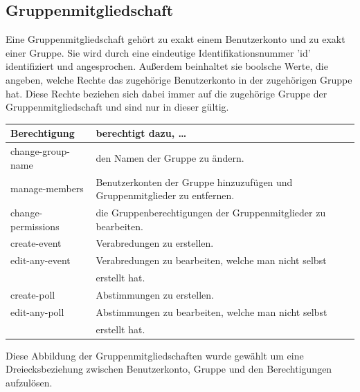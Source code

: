 \documentclass[parskip=full,11pt]{scrartcl}
\begin{document}
\pagebreak

\subsection{Gruppenmitgliedschaft}
Eine Gruppenmitgliedschaft gehört zu exakt einem Benutzerkonto und zu exakt
einer Gruppe. Sie wird durch eine eindeutige Identifikationsnummer 'id'
identifiziert und angesprochen. Außerdem beinhaltet sie boolsche Werte,
die angeben, welche Rechte das zugehörige Benutzerkonto in der zugehörigen
Gruppe hat. Diese Rechte beziehen sich dabei immer auf die zugehörige Gruppe
der Gruppenmitgliedschaft und sind nur in dieser gültig.\\

\begin{tabu} to \linewidth { l X }
    \textbf{Berechtigung} & \textbf{berechtigt dazu, \dots}\\
    \hline
    change-group-name & den Namen der Gruppe zu ändern.\\
    manage-members & Benutzerkonten der Gruppe hinzuzufügen und
    Gruppenmitglieder zu entfernen.\\
    change-permissions & die Gruppenberechtigungen der Gruppenmitglieder zu
    bearbeiten.\\
    create-event & Verabredungen zu erstellen.\\
    edit-any-event & Verabredungen zu bearbeiten, welche man nicht
        selbst\\
     & erstellt hat.\\
    create-poll & Abstimmungen zu erstellen.\\
    edit-any-poll & Abstimmungen zu bearbeiten, welche man nicht
    selbst\\
     & erstellt hat.\\
\end{tabu}

Diese Abbildung der Gruppenmitgliedschaften wurde gewählt um eine
Dreiecksbeziehung zwischen Benutzerkonto,
Gruppe und den Berechtigungen aufzulösen.

\pagebreak
\end{document}
